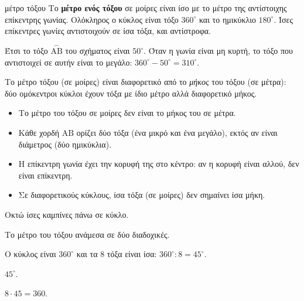 \begin{center}
\end{center}

\begin{kanonas}{μέτρο τόξου}
Το \textbf{μέτρο ενός τόξου} σε μοίρες είναι ίσο με το μέτρο της αντίστοιχης επίκεντρης γωνίας. Ολόκληρος ο κύκλος είναι τόξο $360^\circ$ και το ημικύκλιο $180^\circ$. Ίσες επίκεντρες γωνίες αντιστοιχούν σε ίσα τόξα, και αντίστροφα.
\end{kanonas}

Έτσι το τόξο $\overset{\frown}{\mathrm{ΑΒ}}$ του σχήματος είναι $50^\circ$. Όταν η γωνία είναι μη κυρτή, το τόξο που αντιστοιχεί σε αυτήν είναι το μεγάλο: $360^\circ-50^\circ=310^\circ$.

Το μέτρο τόξου (σε μοίρες) είναι διαφορετικό από το \emph{μήκος} του τόξου (σε μέτρα): δύο ομόκεντροι κύκλοι έχουν τόξα με ίδιο μέτρο αλλά διαφορετικό μήκος.

\begin{prosoxi}
\begin{itemize}[leftmargin=1.2em,itemsep=0.3ex,topsep=2pt]
\item Το μέτρο του τόξου σε μοίρες δεν είναι το μήκος του σε μέτρα.
\item Κάθε χορδή $\mathrm{ΑΒ}$ ορίζει δύο τόξα (ένα μικρό και ένα μεγάλο), εκτός αν είναι διάμετρος (δύο ημικύκλια).
\item Η επίκεντρη γωνία έχει την κορυφή της στο κέντρο: αν η κορυφή είναι αλλού, δεν είναι επίκεντρη.
\item Σε διαφορετικούς κύκλους, ίσα τόξα (σε μοίρες) δεν σημαίνει ίσα μήκη.
\end{itemize}
\end{prosoxi}


\tixero Οκτώ ίσες καμπίνες πάνω σε κύκλο.\par
\tithelo Το μέτρο του τόξου ανάμεσα σε δύο διαδοχικές.\par
\possindeo Ο κύκλος είναι $360^\circ$ και τα $8$ τόξα είναι ίσα: $360^\circ:8=45^\circ$.\par
\apantisi $45^\circ$.\par
\elegxos $8\cdot45=360$.

